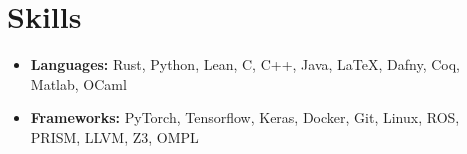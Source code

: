 \section{Skills}

\begin{itemize}
    \item[] \textbf{Languages:} Rust, Python, Lean, C, C++, Java, \LaTeX, Dafny, Coq, Matlab, OCaml
    \vspace{1em}
    \item[] \textbf{Frameworks:} PyTorch, Tensorflow, Keras, Docker, Git, Linux, ROS, PRISM, LLVM, Z3, OMPL
\end{itemize}